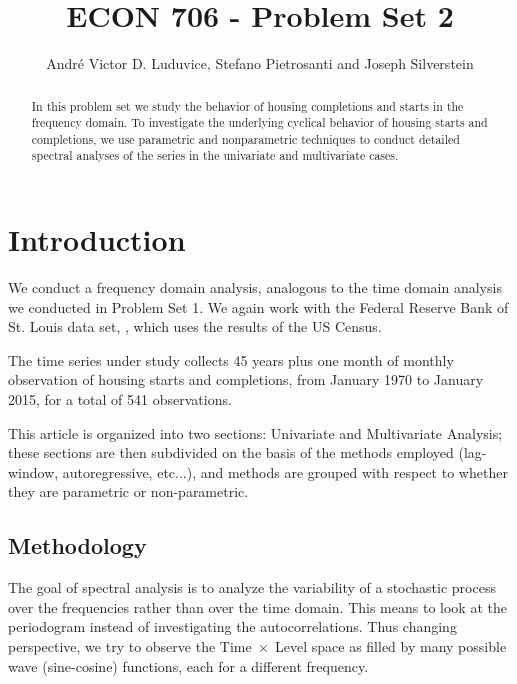 \documentclass[12pt]{article} %
\begin{document}
\title{ECON 706 - Problem Set 2}
\author{Andr\'e Victor D. Luduvice, Stefano Pietrosanti and Joseph Silverstein}

\maketitle

\begin{abstract}
In this problem set we study the behavior of housing completions and starts in the frequency domain. To investigate the underlying cyclical behavior of housing starts and completions, we use parametric and nonparametric techniques to conduct  detailed spectral analyses of the series in the univariate and multivariate cases.

\end{abstract}

\section{Introduction}

We conduct a frequency domain analysis, analogous to the time domain analysis we conducted in Problem Set 1. We again work with the Federal Reserve Bank of St. Louis data set, \citep{dataset}, which uses the results of the US Census.

The time series under study collects 45 years plus one month of monthly observation of housing starts and completions, from January 1970 to January 2015, for a total of 541 observations.

This article is organized into two sections: Univariate and Multivariate Analysis; these sections are then subdivided on the basis of the methods employed (lag-window, autoregressive, etc...), and methods are grouped with respect to whether they are parametric or non-parametric.

\subsection{Methodology}

The goal of spectral analysis is to analyze the variability of a stochastic process over the frequencies rather than over the time domain. This means to look at the periodogram instead of investigating the autocorrelations. Thus changing perspective, we try to observe the Time$\;\times\;$Level space as filled by many possible wave (sine-cosine) functions, each for a different frequency.
\end{document}
